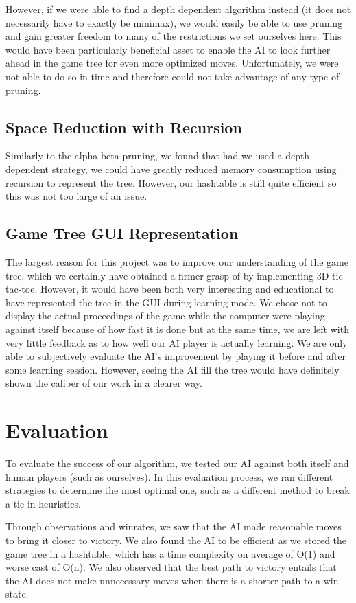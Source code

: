 \documentclass[preprint,12pt]{elsarticle}
\begin{document}
		However, if we were able to find a depth dependent algorithm instead (it does not necessarily have to exactly be minimax), we would easily be able to use pruning and gain greater freedom to many of the restrictions we set ourselves here. This would have been particularly beneficial asset to enable the AI to look further ahead in the game tree for even more optimized moves. Unfortunately, we were not able to do so in time and therefore could not take advantage of any type of pruning.

	\subsection{Space Reduction with Recursion}
		Similarly to the alpha-beta pruning, we found that had we used a depth-dependent strategy, we could have greatly reduced memory consumption using recursion to represent the tree. However, our hashtable is still quite efficient so this was not too large of an issue.

	\subsection{Game Tree GUI Representation}
		The largest reason for this project was to improve our understanding of the game tree, which we certainly have obtained a firmer grasp of by implementing 3D tic-tac-toe. However, it would have been both very interesting and educational to have represented the tree in the GUI during learning mode. We chose not to display the actual proceedings of the game while the computer were playing against itself because of how fast it is done but at the same time, we are left with very little feedback as to how well our AI player is actually learning. We are only able to subjectively evaluate the AI's improvement by playing it before and after some learning session. However, seeing the AI fill the tree would have definitely shown the caliber of our work in a clearer way.

\section{Evaluation}
	To evaluate the success of our algorithm, we tested our AI against both itself and human players (such as ourselves). In this evaluation process, we ran different strategies to determine the most optimal one, such as a different method to break a tie in heuristics.

	Through observations and winrates, we saw that the AI made reasonable moves to bring it closer to victory. We also found the AI to be efficient as we stored the game tree in a hashtable, which has a time complexity on average of O(1) and worse cast of O(n). We also observed that the best path to victory entails that the AI does not make unnecessary moves when there is a shorter path to a win state.
\end{document}
